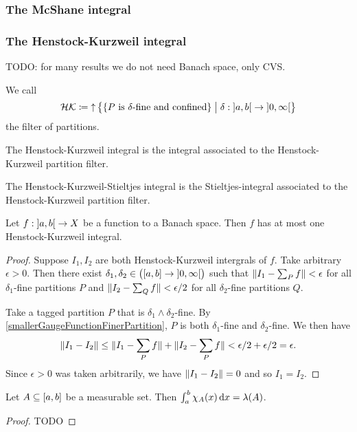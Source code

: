 \subsubsection{The McShane integral}

\subsubsection{The Henstock-Kurzweil integral}
TODO: for many results we do not need Banach space, only CVS.

\begin{definition}
We call
\[ \mathcal{HK} \defeq \upset \setbuilder[\big]{\{\text{$P$ is $\delta$-fine and confined}\}}{\delta: \interval[o]{a,b}\to \interval[o]{0,\infty}} \]
the  filter of partitions.

The Henstock-Kurzweil integral is the integral associated to the Henstock-Kurzweil partition filter.

The Henstock-Kurzweil-Stieltjes integral is the Stieltjes-integral associated to the Henstock-Kurzweil partition filter.
\end{definition}

\begin{lemma}
Let $f: \interval[o]{a,b}\to X$ be a function to a Banach space. Then $f$ has at most one Henstock-Kurzweil integral.
\end{lemma}
\begin{proof}
Suppose $I_1,I_2$ are both Henstock-Kurzweil intergrals of $f$. Take arbitrary $\epsilon > 0$. Then there exist $\delta_1,\delta_2 \in \big(\interval{a,b}\to \interval[o]{0,\infty}\big)$ such that $\lVert I_1 - \sum_P f\rVert < \epsilon$ for all $\delta_1$-fine partitions $P$ and $\lVert I_2 - \sum_Q f\rVert < \epsilon/2$ for all $\delta_2$-fine partitions $Q$.

Take a tagged partition $P$ that is $\delta_1\wedge \delta_2$-fine. By \ref{smallerGaugeFunctionFinerPartition}, $P$ is both $\delta_1$-fine and $\delta_2$-fine. We then have
\[ \lVert I_1 - I_2\rVert \leq \lVert I_1 - \sum_P f\rVert + \lVert I_2 - \sum_P f\rVert < \epsilon /2 + \epsilon /2 = \epsilon. \]
Since $\epsilon > 0$ was taken arbitrarily, we have $\lVert I_1 - I_2\rVert = 0$ and so $I_1 = I_2$.
\end{proof}

\begin{lemma}
Let $A\subseteq \interval{a,b}$ be a measurable set. Then $\int_a^b \chi_{A}(x)\operatorname{d \!}{x} = \lambda(A)$.
\end{lemma}
\begin{proof}
TODO
\end{proof}

